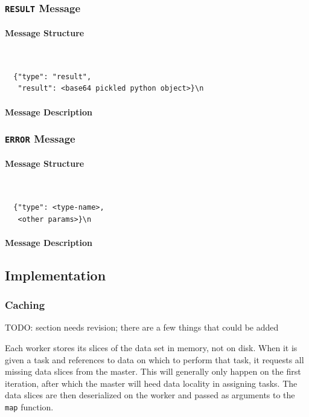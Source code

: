 \documentclass[%
  final,
  notitlepage,
  narroweqnarray,
  inline,
]{ieee}
\begin{document}
\subsubsection{\texttt{RESULT} Message}

\paragraph{Message Structure}
{\tt \small
\begin{verbatim}
  {"type": "result",
   "result": <base64 pickled python object>}\n
\end{verbatim}}

\paragraph{Message Description}



\subsubsection{\texttt{ERROR} Message}

\paragraph{Message Structure}
{\tt \small
\begin{verbatim}
  {"type": <type-name>,
   <other params>}\n
\end{verbatim}}

\paragraph{Message Description}




\subsection{Implementation}
\label{Implementation}


\subsubsection{Caching}

TODO: section needs revision; there are a few things that could be added

Each worker stores its slices of the data set in memory, not on disk. When it
is given a task and references to data on which to perform that task, it
requests all missing data slices from the master. This will generally only
happen on the first iteration, after which the master will heed data locality
in assigning tasks. The data slices are then deserialized on the worker and
passed as arguments to the {\tt map} function.
\end{document}
